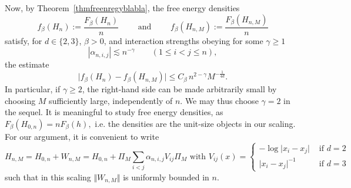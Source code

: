 \documentclass[11pt]{amsart}
\newcommand{\1}{\mathbbm{1}}
\theoremstyle{plain}
\theoremstyle{definition}
\theoremstyle{remark}
\numberwithin{equation}{section}
\begin{document}
\noindent Now, by Theorem~\ref{thmfreenregyblabla}, the free energy densities 
\[
f_{\beta}(H_n):=\frac{F_{\beta}(H_n)}{n}
\qquad \text{ and }\qquad
f_{\beta}(H_{n,M}):=\frac{F_{\beta}(H_{n,M})}{n}
\]
satisfy, for $d\in\{2,3\}$, $\beta>0$, and interaction strengths obeying for some $\gamma\ge 1$ 
\begin{equation}
\label{eq:i_strengths}
|\alpha_{n,i,j}|\lesssim n^{-\gamma}\qquad(1\le i<j\le n),
\end{equation}
the estimate
\[
\bigl| f_{\beta}(H_n)-f_{\beta}(H_{n,M}) \bigr|
\le C_\beta\, n^{2-\gamma} M^{-\frac{1}{4d}}.
\]
In particular, if $\gamma\ge 2$, the right-hand side can be made arbitrarily small by choosing $M$ sufficiently large, independently of $n$. We may thus choose $\gamma=2$ in the sequel. It is meaningful to study free energy densities, as $F_{\beta}(H_{0,n})=n F_{\beta}(h),$ i.e. the densities are the unit-size objects in our scaling. 
For our argument, it is convenient to write 
\[H_{n,M}=H_{0,n} + W_{n,M}=H_{0,n}+\Pi_M \sum_{i<j} \alpha_{n,i,j} V_{ij} \Pi_M \text{ with } V_{ij}(x)=\begin{cases}
-\log \vert x_i-x_j \vert &\text{ if }d=2\\
    \vert x_i-x_j \vert^{-1} &\text{ if }d=3
\end{cases} \]
such that in this scaling $\Vert W_{n,M}\Vert$ is uniformly bounded in $n$.
\end{document}
